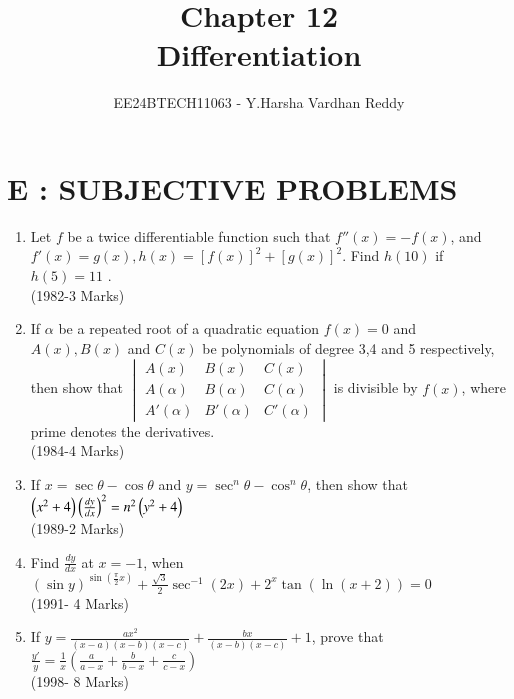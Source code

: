 \documentclass[journal,,12pt,twocolumn]{IEEEtran}
\theoremstyle{remark}
\begin{document}

\vspace{3cm}

\title{Chapter 12\\Differentiation}
\author{EE24BTECH11063 - Y.Harsha Vardhan Reddy}
\maketitle
\newpage
\bigskip

\renewcommand{\thefigure}{\theenumi}
\renewcommand{\thetable}{\theenumi}

\section*{E : SUBJECTIVE PROBLEMS}
\begin{enumerate}
\item Let $f$ be a twice differentiable function such that 
$f''(x)=-f(x)$, and $f'(x)=g(x) , h(x)=[f(x)]^2+[g(x)]^2$. Find $h(10)$ if $h(5)=11$ .\\
\hfill{(1982-3 Marks)}
\item If $\alpha$ be a repeated root of a quadratic equation $f(x)=0$ and $A(x),B(x)$ and $C(x)$ be polynomials of degree 3,4 and 5 respectively, then show that $\begin{vmatrix}
A(x) & B(x) & C(x) \\
A(\alpha) & B(\alpha) & C(\alpha) \\
A'(\alpha) & B'(\alpha) & C'(\alpha) 
\end{vmatrix}$ 
is divisible by $f(x)$, where prime denotes the derivatives.\\
\hfill{(1984-4 Marks)}
\item If $x=\sec{\theta}-\cos{\theta}$ and $y=\sec^n{\theta}-\cos^n{\theta}$, then show that $ \left(x^2 + 4\right) \left(\frac{dy}{dx}\right)^2=n^2 \left(y^2+4\right)$ \\
\hfill{(1989-2 Marks)}
\item Find $\frac{dy}{dx}$ at $x=-1$, when $(\sin{y})^{\sin(\frac{\pi}{2}x)} + \frac{\sqrt{3}}{2}\sec^{-1}{(2x)} + 2^x\tan{(\ln{(x+2)})} = 0 $\\
\hfill{(1991- 4 Marks)}
\item If $y = \frac{ax^2}{(x-a)(x-b)(x-c)}+\frac{bx}{(x-b)(x-c)}+1$, prove that $\frac{y'}{y}=\frac{1}{x}(\frac{a}{a-x}+\frac{b}{b-x}+\frac{c}{c-x})$\\
\hfill{(1998- 8 Marks)}
\end{enumerate}
\end{document}
